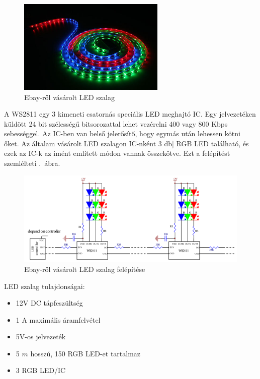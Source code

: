 \documentclass[../main.tex]{subfiles}
\begin{document}
            \begin{figure}[h!]
                \centering
                    \includegraphics[width=7cm]{resources/pcb_res/ledstrip}
                \caption{Ebay-ről vásárolt LED szalag}
                \label{fig:ledstrip}
            \end{figure}
        
            A WS2811 egy 3 kimeneti csatornás speciális LED meghajtó IC. Egy jelvezetéken küldött 24 bit szélességű bitsorozattal lehet vezérelni 400 vagy 800 Kbps sebességgel. Az IC-ben van belső jelerősítő, hogy egymás után lehessen kötni őket. Az általam vásárolt LED szalagon IC-nként 3 db] RGB LED található, és ezek az IC-k az imént említett módon vannak összekötve. Ezt a felépítést szemlélteti .~ábra.\\[12px]
            
            \begin{figure}[h!]
                \centering
                \includegraphics[width=14cm]{resources/pcb_res/ledstrip_schematic.png}
                \caption{Ebay-ről vásárolt LED szalag felépítése\cite{ds_ws2811}}
                \label{fig:ledstrip_schematic}
            \end{figure}
            
            LED szalag tulajdonságai:
            \begin{itemize}
                \item 12V DC tápfeszültség
                \item 1 A maximális áramfelvétel
                \item 5V-os jelvezeték
                \item 5 $m$ hosszú, 150 RGB LED-et tartalmaz
                \item 3 RGB LED/IC
            \end{itemize}
            
\end{document}
